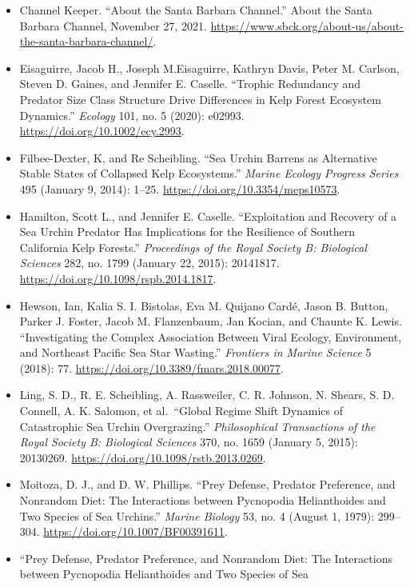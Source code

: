 \documentclass[
]{article}
\begin{document}
\begin{itemize}
\item
  Channel Keeper. ``About the Santa Barbara Channel.'' About the Santa
  Barbara Channel, November 27, 2021.
  \url{https://www.sbck.org/about-us/about-the-santa-barbara-channel/}.
\item
  Eisaguirre, Jacob H., Joseph M.Eisaguirre, Kathryn Davis, Peter M.
  Carlson, Steven D. Gaines, and Jennifer E. Caselle. ``Trophic
  Redundancy and Predator Size Class Structure Drive Differences in Kelp
  Forest Ecosystem Dynamics.'' \emph{Ecology} 101, no. 5 (2020): e02993.
  \url{https://doi.org/10.1002/ecy.2993}.
\item
  Filbee-Dexter, K, and Re Scheibling. ``Sea Urchin Barrens as
  Alternative Stable States of Collapsed Kelp Ecosystems.'' \emph{Marine
  Ecology Progress Series} 495 (January 9, 2014): 1--25.
  \url{https://doi.org/10.3354/meps10573}.
\item
  Hamilton, Scott L., and Jennifer E. Caselle. ``Exploitation and
  Recovery of a Sea Urchin Predator Has Implications for the Resilience
  of Southern California Kelp Forests.'' \emph{Proceedings of the Royal
  Society B: Biological Sciences} 282, no. 1799 (January 22, 2015):
  20141817. \url{https://doi.org/10.1098/rspb.2014.1817}.
\item
  Hewson, Ian, Kalia S. I. Bistolas, Eva M. Quijano Cardé, Jason B.
  Button, Parker J. Foster, Jacob M. Flanzenbaum, Jan Kocian, and
  Chaunte K. Lewis. ``Investigating the Complex Association Between
  Viral Ecology, Environment, and Northeast Pacific Sea Star Wasting.''
  \emph{Frontiers in Marine Science} 5 (2018): 77.
  \url{https://doi.org/10.3389/fmars.2018.00077}.
\item
  Ling, S. D., R. E. Scheibling, A. Rassweiler, C. R. Johnson, N.
  Shears, S. D. Connell, A. K. Salomon, et al.~``Global Regime Shift
  Dynamics of Catastrophic Sea Urchin Overgrazing.'' \emph{Philosophical
  Transactions of the Royal Society B: Biological Sciences} 370, no.
  1659 (January 5, 2015): 20130269.
  \url{https://doi.org/10.1098/rstb.2013.0269}.
\item
  Moitoza, D. J., and D. W. Phillips. ``Prey Defense, Predator
  Preference, and Nonrandom Diet: The Interactions between Pycnopodia
  Helianthoides and Two Species of Sea Urchins.'' \emph{Marine Biology}
  53, no. 4 (August 1, 1979): 299--304.
  \url{https://doi.org/10.1007/BF00391611}.
\item
  ``Prey Defense, Predator Preference, and Nonrandom Diet: The
  Interactions between Pycnopodia Helianthoides and Two Species of Sea

\end{itemize}
\end{document}
